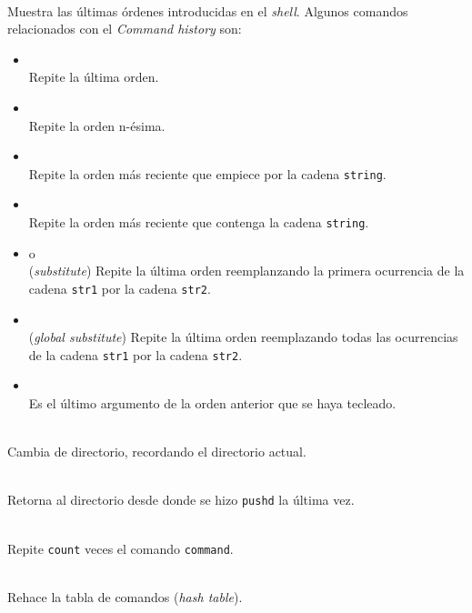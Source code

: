 \vspace{.3cm}

\noindent
{}\\[1mm]
Muestra las {\'u}ltimas {\'o}rdenes introducidas en el {\it shell}. Algunos
comandos relacionados con el {\it Command history} son:
\begin{itemize}
\item \comando{!!}\\ Repite la {\'u}ltima orden.
\item {}\\ Repite la orden n-{\'e}sima.
\item {}\\[1mm] Repite la orden m{\'a}s reciente que empiece por
  la cadena \verb+string+.
\item {}\\[1mm] 
Repite la orden m{\'a}s reciente que contenga la cadena \verb+string+.
\item {} o \\[1mm]
({\it substitute}) Repite la {\'u}ltima orden reemplanzando la
primera ocurrencia de la cadena \verb+str1+ por la cadena \verb+str2+.
\item {}\\[1mm]
({\it global substitute}) Repite la {\'u}ltima orden reemplazando todas
las ocurrencias de la cadena \verb+str1+ por la cadena \verb+str2+.
\item \comando{!\$}\\[1mm]
Es el {\'u}ltimo argumento de la orden anterior que se haya tecleado.
\end{itemize}

\noindent
{}\\[1mm]
Cambia de directorio, recordando el directorio actual.

\vspace{0.2cm}

\noindent
{}\\[1mm]
Retorna al directorio desde donde se hizo \verb+pushd+ la {\'u}ltima vez. 

\vspace{0.2cm}
\noindent
{}\\[1mm]
Repite \verb+count+ veces el comando \verb+command+.

\vspace{0.2cm}
\noindent
{}\\[1mm]
Rehace la tabla de comandos ({\it hash table}).

